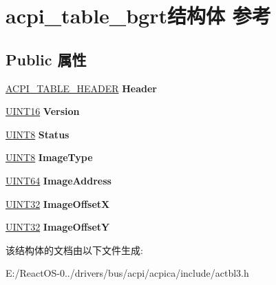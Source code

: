 \hypertarget{structacpi__table__bgrt}{}\section{acpi\+\_\+table\+\_\+bgrt结构体 参考}
\label{structacpi__table__bgrt}
\subsection*{Public 属性}
\begin{DoxyCompactItemize}
\item 
\mbox{\label{structacpi__table__bgrt_aa2ae16c237a5c81c5598f8275f0b70ba}} 
\hyperlink{structacpi__table__header}{A\+C\+P\+I\+\_\+\+T\+A\+B\+L\+E\+\_\+\+H\+E\+A\+D\+ER} {\bfseries Header}
\item 
\mbox{\label{structacpi__table__bgrt_a6dd2a196e5c715ddf49b5458c4966883}} 
\hyperlink{_processor_bind_8h_a09f1a1fb2293e33483cc8d44aefb1eb1}{U\+I\+N\+T16} {\bfseries Version}
\item 
\mbox{\label{structacpi__table__bgrt_aae1d92c2a374c52edf75ea15f63f7a14}} 
\hyperlink{_processor_bind_8h_ab27e9918b538ce9d8ca692479b375b6a}{U\+I\+N\+T8} {\bfseries Status}
\item 
\mbox{\label{structacpi__table__bgrt_a1fab64488ab036204c245515bfe8ffb7}} 
\hyperlink{_processor_bind_8h_ab27e9918b538ce9d8ca692479b375b6a}{U\+I\+N\+T8} {\bfseries Image\+Type}
\item 
\mbox{\label{structacpi__table__bgrt_aaf07ab2c676b13d436ba7af5ebeca84a}} 
\hyperlink{_processor_bind_8h_a57be03562867144161c1bfee95ca8f7c}{U\+I\+N\+T64} {\bfseries Image\+Address}
\item 
\mbox{\label{structacpi__table__bgrt_a70a003e56306380caec05413c5efe0ce}} 
\hyperlink{_processor_bind_8h_ae1e6edbbc26d6fbc71a90190d0266018}{U\+I\+N\+T32} {\bfseries Image\+OffsetX}
\item 
\mbox{\label{structacpi__table__bgrt_adcaf766b0c3f5bb5f6f0d4f574a78619}} 
\hyperlink{_processor_bind_8h_ae1e6edbbc26d6fbc71a90190d0266018}{U\+I\+N\+T32} {\bfseries Image\+OffsetY}
\end{DoxyCompactItemize}


该结构体的文档由以下文件生成\+:\begin{DoxyCompactItemize}
\item 
E\+:/\+React\+O\+S-\/0../drivers/bus/acpi/acpica/include/actbl3.\+h\end{DoxyCompactItemize}
